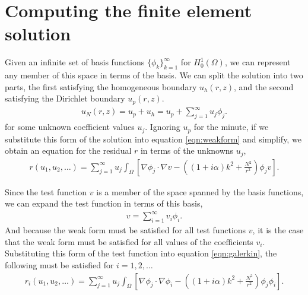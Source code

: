 \section{Computing the finite element solution}

\iffalse
Write in residual form
- don't be equal to 0, easier to write equations.

.We're given an infinite basis.
.Expand the solution in terms of the basis functions.
.Substitute this sum into the weak form.
.Represent test functions as sum of basis functions (Galerkin).
Perform truncation of the series.
Compute the weighted residual using numerical integration.
Compute the Jacobian matrix.
Solve the linear system (MG).
Obtain the finite element solution.
\fi

Given an infinite set of basis functions $\{ \phi_k \}_{k=1}^\infty$ for $H^1_0(\Omega)$, we can represent any member of this space in terms of the basis.
We can split the solution into two parts, the first satisfying the homogeneous boundary $u_h(r,z)$, and the second satisfying the Dirichlet boundary $u_p(r,z)$.
\begin{align}
	u_N(r,z) = u_p + u_h = u_p + \sum_{j=1}^\infty u_j \phi_j.
\end{align}
for some unknown coefficient values $u_j$.
Ignoring $u_p$ for the minute, if we substitute this form of the solution into equation \eqref{eqn:weakform} and simplify, we obtain an equation for the residual $r$ in terms of the unknowns $u_j$,
\begin{align}
	r(u_1,u_2,\ldots) = \sum_{j=1}^\infty u_j \int_\Omega \left[ \nabla \phi_j \cdot \nabla v - \left( (1+i\alpha)k^2 + \frac{N^2}{r^2}\right) \phi_j v \right]. \label{eqn:galerkin}
\end{align}

Since the test function $v$ is a member of the space spanned by the basis functions, we can expand the test function in terms of this basis,
\begin{align}
	v = \sum_{i=1}^\infty v_i \phi_i.
\end{align}
And because the weak form must be satisfied for all test functions $v$, it is the case that the weak form must be satisfied for all values of the coefficients $v_i$.
Substituting this form of the test function into equation \eqref{eqn:galerkin}, the following must be satisfied for $i=1,2,\ldots$
\begin{align}
	r_i(u_1,u_2,\ldots)=\sum_{j=1}^\infty u_j \int_\Omega \left[ \nabla \phi_j \cdot \nabla \phi_i - \left( (1+i\alpha)k^2 + \frac{N^2}{r^2}\right) \phi_j \phi_i \right].
\end{align}


